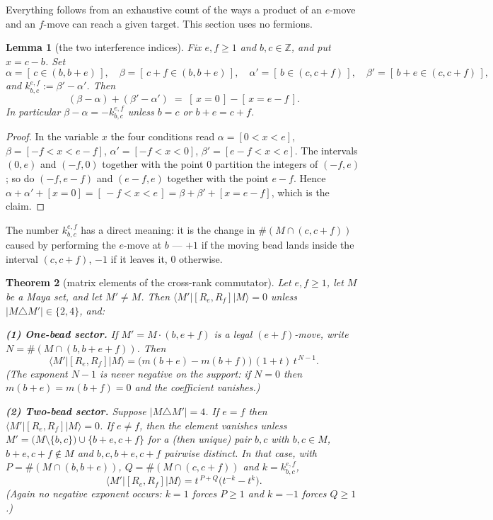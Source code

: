 \documentclass[11pt]{article}
\newtheorem{theorem}{Theorem}
\newtheorem{lemma}[theorem]{Lemma}
\theoremstyle{definition}
\newcommand{\Z}{\mathbb{Z}}
\begin{document}
Everything follows from an exhaustive count of the ways a product of an $e$-move and an
$f$-move can reach a given target.  This section uses no fermions.

\begin{lemma}[the two interference indices]\label{lem:kappa}
Fix $e,f\ge1$ and $b,c\in\Z$, and put $x=c-b$.  Set
\[
 \alpha=[\,c\in(b,b+e)\,],\quad \beta=[\,c+f\in(b,b+e)\,],\quad
 \alpha'=[\,b\in(c,c+f)\,],\quad \beta'=[\,b+e\in(c,c+f)\,],
\]
and $k^{e,f}_{b,c}:=\beta'-\alpha'$.  Then
\[
 (\beta-\alpha)+(\beta'-\alpha')\;=\;[\,x=0\,]-[\,x=e-f\,].
\]
In particular $\beta-\alpha=-k^{e,f}_{b,c}$ unless $b=c$ or $b+e=c+f$.
\end{lemma}

\begin{proof}
In the variable $x$ the four conditions read $\alpha=[0<x<e]$, $\beta=[-f<x<e-f]$,
$\alpha'=[-f<x<0]$, $\beta'=[e-f<x<e]$.  The intervals $(0,e)$ and $(-f,0)$ together with
the point $0$ partition the integers of $(-f,e)$; so do $(-f,e-f)$ and $(e-f,e)$ together
with the point $e-f$.  Hence
$\alpha+\alpha'+[x=0]=[\,-f<x<e\,]=\beta+\beta'+[x=e-f]$, which is the claim.
\end{proof}

The number $k^{e,f}_{b,c}$ has a direct meaning: it is the change in
$\#(M\cap(c,c+f))$ caused by performing the $e$-move at $b$ --- $+1$ if the moving bead
lands inside the interval $(c,c+f)$, $-1$ if it leaves it, $0$ otherwise.

\begin{theorem}[matrix elements of the cross-rank commutator]\label{thm:matrix}
Let $e,f\ge1$, let $M$ be a Maya set, and let $M'\ne M$.  Then
$\langle M'|[R_e,R_f]|M\rangle=0$ unless $|M\triangle M'|\in\{2,4\}$, and:

\smallskip
\noindent\textbf{(1) One-bead sector.}  If $M'=M\cdot(b,e+f)$ is a legal $(e{+}f)$-move,
write $N=\#(M\cap(b,b+e+f))$.  Then
\[
 \boxed{\ \langle M'|[R_e,R_f]|M\rangle=\bigl(m(b+e)-m(b+f)\bigr)\,(1+t)\,t^{\,N-1}.\ }
\]
(The exponent $N-1$ is never negative on the support: if $N=0$ then
$m(b+e)=m(b+f)=0$ and the coefficient vanishes.)

\smallskip
\noindent\textbf{(2) Two-bead sector.}  Suppose $|M\triangle M'|=4$.  If $e=f$ then
$\langle M'|[R_e,R_f]|M\rangle=0$.  If $e\ne f$, then the element vanishes unless
$M'=\bigl(M\setminus\{b,c\}\bigr)\cup\{b+e,c+f\}$ for a (then unique) pair $b,c$ with
$b,c\in M$, $b+e,c+f\notin M$ and $b,c,b+e,c+f$ pairwise distinct.  In that case, with
$P=\#(M\cap(b,b+e))$, $Q=\#(M\cap(c,c+f))$ and $k=k^{e,f}_{b,c}$,
\[
 \boxed{\ \langle M'|[R_e,R_f]|M\rangle=t^{\,P+Q}\bigl(t^{-k}-t^{k}\bigr).\ }
\]
(Again no negative exponent occurs: $k=1$ forces $P\ge1$ and $k=-1$ forces $Q\ge1$.)
\end{theorem}
\end{document}
